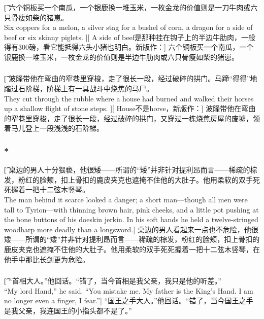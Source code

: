 \documentclass[12pt,a4paper]{article}
\begin{document}
\subsubsection{}\t[
	六个铜板买一个南瓜，一个银鹿换一堆玉米，一枚金龙的价值则是一刀牛肉或六只骨瘦如柴的猪崽。\\
	Six coppers for a melon, a silver stag for a bushel of corn, a dragon for a side of beef or six skinny piglets. ][
	A side of beef是那种挂在钩子上的半边牛肋肉，一般得有300磅，看它能抵得六头小猪也明白。新版作：]
	六个铜板买一个南瓜，一个银鹿换一堆玉米，一枚金龙的价值则是半边牛肋肉或六只骨瘦如柴的猪崽。
	
\subsubsection{}\t[
	波隆带他在弯曲的窄巷里穿梭，走了很长一段，经过破碎的拱门。马蹄“得得”地踏过石阶梯，阶梯上有一具战斗中烧焦的马尸。\\
	They cut through the rubble where a house had burned and walked their horses up a shallow flight of stone steps. ][
	House不是horse，新版作：]
	波隆带他在弯曲的窄巷里穿梭，走了很长一段，经过破碎的拱门，又穿过一栋烧焦房屋的废墟，领着马儿登上一段浅浅的石阶梯。
	
\subsubsection{\color{red}*}\t[
	桌边的男人十分猥亵，他很矮——所谓的“矮”并非针对提利昂而言——稀疏的棕发，粉红的脸颊，扣上骨扣的鹿皮夹克也遮掩不住他的大肚子。他用柔软的双手死死握着一把十二弦木竖琴。\\
	The man behind it scarce looked a danger; a short man—though all men were tall to Tyrion—with thinning brown hair, pink cheeks, and a little pot pushing at the bone buttons of his doeskin jerkin. In his soft hands he held a twelve-stringed woodharp more deadly than a longsword.]
	桌边的男人看起来一点也不危险，他很矮——所谓的“矮”并非针对提利昂而言——稀疏的棕发，粉红的脸颊，扣上骨扣的鹿皮夹克也遮掩不住他的大肚子。他用柔软的双手死死握着一把十二弦木竖琴，在他手中那比长剑更为危险。
	
\subsubsection{}\t[
	 “首相大人。”他回话。“错了，当今首相是我父亲，我只是他的听差。”\\
	 “My lord Hand,” he said. “You mistake me. My father is the King's Hand. I am no longer even a finger, I fear.”]
	 “国王之手大人。”他回话。“错了，当今国王之手是我父亲，我连国王的小指头都不是了。”
	 
\end{document}
